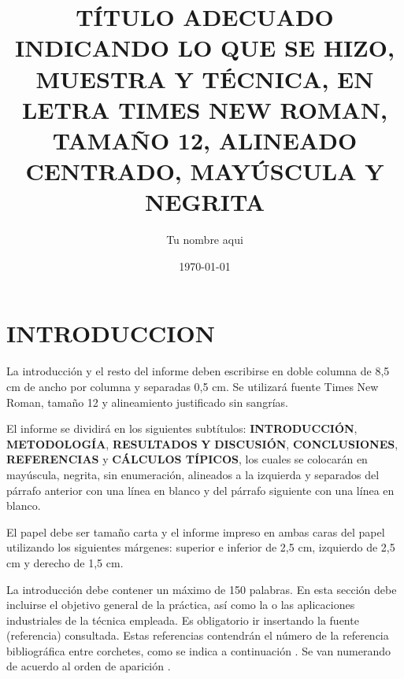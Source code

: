 \documentclass[12pt,letterpaper,twocolumn,twoside]{article}
\title{TÍTULO ADECUADO INDICANDO LO QUE SE HIZO, MUESTRA Y TÉCNICA, EN LETRA TIMES NEW ROMAN, TAMAÑO 12, ALINEADO CENTRADO, MAYÚSCULA Y NEGRITA}
\author{Tu nombre aqui}
\date{\today} %
\begin{document}

\section*{INTRODUCCION}

La introducción y el resto del informe deben
escribirse en doble columna de 8,5 cm de ancho
por columna y separadas 0,5 cm. Se utilizará
fuente Times New Roman, tamaño 12 y
alineamiento justificado sin sangrías.

El informe se dividirá en los siguientes subtítulos:
\textbf{INTRODUCCIÓN}, \textbf{METODOLOGÍA},
\textbf{RESULTADOS} \textbf{Y} \textbf{DISCUSIÓN},
\textbf{CONCLUSIONES}, \textbf{REFERENCIAS} y
\textbf{CÁLCULOS TÍPICOS}, los cuales se colocarán
en mayúscula, negrita, sin enumeración,
alineados a la izquierda y separados del párrafo
anterior con una línea en blanco y del párrafo
siguiente con una línea en blanco.

El papel debe ser tamaño carta y el informe
impreso en ambas caras del papel utilizando los
siguientes márgenes: superior e inferior de
2,5 cm, izquierdo de 2,5 cm y derecho de 1,5 cm.

La introducción debe contener un máximo de 150
palabras. En esta sección debe incluirse el
objetivo general de la práctica, así como la o las
aplicaciones industriales de la técnica empleada.
Es obligatorio ir insertando la fuente (referencia)
consultada. Estas referencias contendrán el
número de la referencia bibliográfica entre
corchetes, como se indica a continuación \cite{PeLo95}. Se
van numerando de acuerdo al orden de aparición
\cite{hasegawa}.
\end{document}
